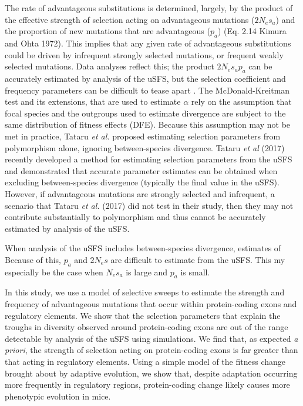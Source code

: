 \documentclass[11pt]{article}
\begin{document}
The rate of advantageous substitutions is determined, largely, by the product of the effective strength of selection acting on advantageous mutations ($2N_es_a$) and the proportion of new mutations that are advantageous ($p_a$) (Eq. 2.14 Kimura and Ohta 1972). This implies that any given rate of advantageous substitutions could be driven by infrequent strongly selected mutations, or frequent weakly selected mutations. Data analyses reflect this; the product $2N_es_ap_a$ can be accurately estimated by analysis of the uSFS, but the selection coefficient and frequency parameters can be difficult to tease apart \citep{RN210,RN354}. The McDonald-Kreitman test \citep{RN293} and its extensions, that are used to estimate $\alpha$ rely on the assumption that focal species and the outgroups used to estimate divergence are subject to the same distribution of fitness effects (DFE). Because this assumption may not be met in practice, Tataru \textit{et al.} proposed estimating selection parameters from polymorphism alone, ignoring between-species divergence. 
Tataru \textit{et al} (2017) recently developed a method for estimating selection parameters from the uSFS and demonstrated that accurate parameter estimates can be obtained when excluding between-species divergence (typically the final value in the uSFS). 
However, if advantageous mutations are strongly selected and infrequent, a scenario that Tataru \textit{et al.} (2017) did not test in their study, then they may not contribute substantially to polymorphism and thus cannot be accurately estimated by analysis of the uSFS.

When analysis of the uSFS includes between-species divergence, estimates of 
 Because of this, $p_a$ and $2N_es$ are difficult to estimate from the uSFS. This my especially be the case when $N_es_a$ is large and $p_a$ is small.

In this study, we use a model of selective sweeps to estimate the strength and frequency of advantageous mutations that occur within protein-coding exons and regulatory elements. We show that the selection parameters that explain the troughs in diversity observed around protein-coding exons are out of the range detectable by analysis of the uSFS using simulations.  We find that, as expected \textit{a priori}, the strength of selection acting on protein-coding exons is far greater than that acting in regulatory elements. Using a simple model of the fitness change brought about by adaptive evolution, we show that, despite adaptation occurring more frequently in regulatory regions, protein-coding change likely causes more phenotypic evolution in mice.
\end{document}
